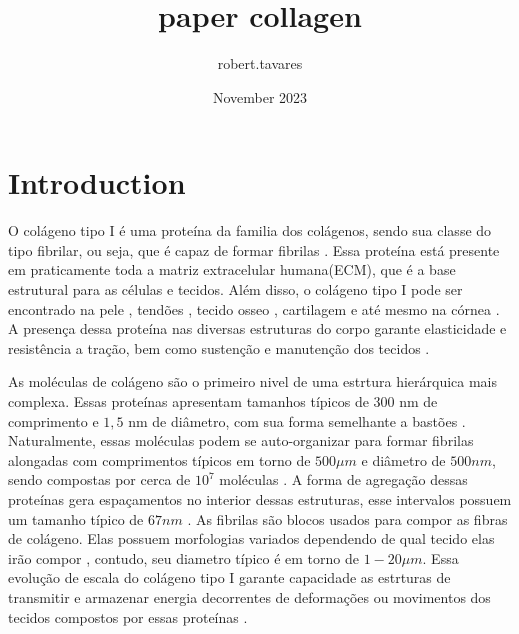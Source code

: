 \documentclass{report}
\title{paper collagen}
\author{robert.tavares}
\date{November 2023}
\begin{document}
\maketitle

\section{Introduction}

    O colágeno tipo I é uma proteína da familia dos colágenos, sendo sua classe do tipo fibrilar, ou seja, que é capaz de formar 
    fibrilas \cite{Silver2018}. Essa proteína	está presente em praticamente toda a matriz extracelular humana(ECM), que é 
    a base estrutural para as células e tecidos. Além disso, o colágeno tipo I pode ser encontrado na pele 
    \cite{Davison-Kotler2019-do}, tendões \cite{Tresoldi2013-qq}, tecido osseo \cite{FEDARKO201445, RicoLlanos2021}, cartilagem 
    \cite{Sophia_Fox2009-qd} e até mesmo na córnea \cite{CHEN201569}. A presença dessa proteína nas diversas estruturas do corpo 
    garante elasticidade e resistência a tração, bem como sustenção e manutenção dos tecidos \cite{Silver2018,Amirrah2022-uh}.  
    
    As moléculas de colágeno são o primeiro nivel de uma estrtura hierárquica mais complexa. Essas proteínas apresentam tamanhos
    típicos de $300$ nm de comprimento e $1,5$ nm de diâmetro, com sua forma semelhante a bastões \cite{Gelse2003,Silver2018}. 
    Naturalmente, essas moléculas podem se auto-organizar para formar fibrilas alongadas com comprimentos típicos em torno de 
    \(500 \mu m\) e diâmetro de \(500 nm\), sendo compostas por cerca de \(10^{7}\) moléculas \cite{Charvolin2019, KADLER1996, 
    Parry1984}. A forma de agregação dessas proteínas gera espaçamentos no interior dessas estruturas, esse intervalos possuem 
    um tamanho  típico de \(67 nm\) \cite{Zhu2018}. As fibrilas são blocos usados para compor as fibras de colágeno. Elas possuem 
    morfologias variados dependendo de qual tecido elas irão compor \cite{Amirrah2022-uh}, contudo, seu diametro típico é em torno 
    de \(1-20 \mu m\). Essa evolução de escala do colágeno tipo I garante capacidade as estrturas de transmitir e armazenar energia 
    decorrentes de deformações ou movimentos dos tecidos compostos por essas proteínas \cite{Silver2008ViscoelasticityES}.
\end{document}

